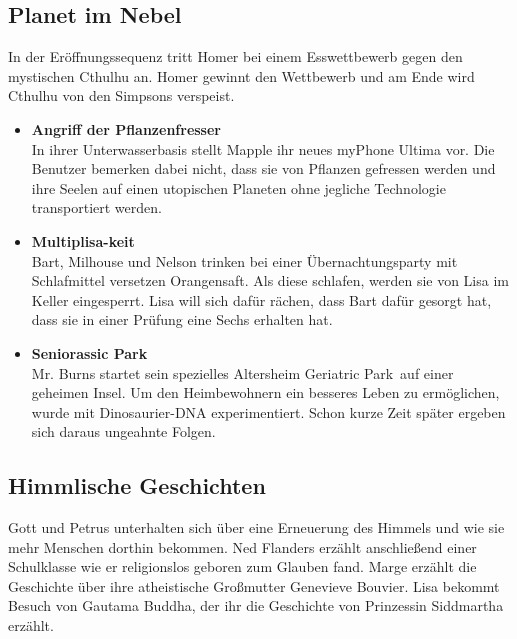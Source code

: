 \subsection{Planet im Nebel}
In der Eröffnungssequenz tritt Homer bei einem Esswettbewerb gegen den mystischen Cthulhu an. Homer gewinnt den Wettbewerb und am Ende wird Cthulhu von den Simpsons verspeist.
\begin{itemize}
  \item \textbf{Angriff der Pflanzenfresser}\\ In ihrer Unterwasserbasis stellt Mapple ihr neues myPhone Ultima vor. Die Benutzer bemerken dabei nicht, dass sie von Pflanzen gefressen werden und ihre Seelen auf einen utopischen Planeten ohne jegliche Technologie transportiert werden.
  \item \textbf{Multiplisa-keit}\\ Bart, Milhouse und Nelson trinken bei einer Übernachtungsparty mit Schlafmittel versetzen Orangensaft. Als diese schlafen, werden sie von Lisa im Keller eingesperrt. Lisa will sich dafür rächen, dass Bart dafür gesorgt hat, dass sie in einer Prüfung eine Sechs erhalten hat.
  \item  \textbf{Seniorassic Park}\\ Mr. Burns startet sein spezielles Altersheim \glqq Geriatric Park\grqq\ auf einer geheimen Insel. Um den Heimbewohnern ein besseres Leben zu ermöglichen, wurde mit Dinosaurier-DNA experimentiert. Schon kurze Zeit später ergeben sich daraus ungeahnte Folgen.
\end{itemize}


\subsection{Himmlische Geschichten}\label{XABF17}
Gott und Petrus unterhalten sich über eine Erneuerung des Himmels und wie sie mehr Menschen dorthin bekommen. Ned Flanders erzählt anschließend einer Schulklasse wie er religionslos geboren zum Glauben fand. Marge erzählt die Geschichte über ihre atheistische Großmutter Genevieve Bouvier. Lisa bekommt Besuch von Gautama Buddha, der ihr die Geschichte von Prinzessin Siddmartha erzählt.

